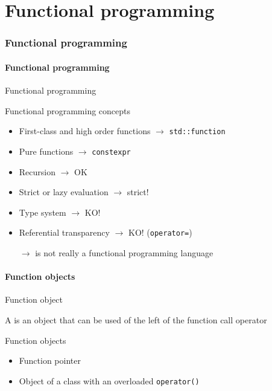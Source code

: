 \part{Functional programming}

\section{Functional programming}

\subsection{Functional programming}

\begin{frame}{Functional programming}{}
  \begin{block}{Functional programming concepts}
    \begin{itemize}
    \item
      First-class and high order functions $\to$ \lstinline!std::function!
    \item
      Pure functions $\to$ \lstinline!constexpr!
    \item
      Recursion $\to$ OK
    \item
      Strict or lazy evaluation $\to$ strict!
    \item
      Type system $\to$ KO!
    \item
      Referential transparency $\to$ KO! (\lstinline!operator=!)
    \item[$\to$]
      \CCLang is not really a functional programming language
    \end{itemize}
  \end{block}
\end{frame}


\subsection{Function objects}

\begin{frame}{Function object}{}
  \begin{definition}
    A  is an object that can be used of the left of the function call operator
  \end{definition}

  \begin{block}{Function objects}
    \begin{itemize}
    \item
      Function pointer
    \item
      Object of a class with an overloaded \lstinline!operator()!
    \end{itemize}
  \end{block}
\end{frame}


